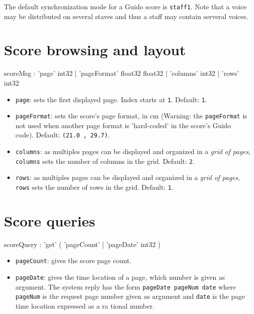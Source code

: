 \documentclass[a4paper,twoside]{report}
\newcommand{\sublevel}[1]	{\section{#1}}
\newcommand{\OSC}[1]		{\texttt{#1}}
\newcommand{\values}[1]	{\texttt{#1}}
\begin{document}
The default synchronization mode for a Guido score is \OSC{staff1}.
Note that a voice may be distributed on several staves and thus a staff may contain serveral voices.


\sublevel{Score browsing and layout}
\label{guidolayout}

\begin{rail}
scoreMsg : 	  'page' int32
				| 'pageFormat' float32 float32
				| 'columns' int32
				| 'rows' int32
\end{rail}

\begin{itemize}
\item \OSC{page}: sets the first displayed page. Index starts at \values{1}. Default: \values{1}.

\item \OSC{pageFormat}: sets the score's page format, in cm (Warning: the \OSC{pageFormat} is not used when another page format is 'hard-coded' in the score's Guido code). Default: \values{(21.0 , 29.7)}.

\item \OSC{columns}: as multiples pages can be displayed and organized in a \emph{grid of pages}, \OSC{columns} sets the number of columns in the grid. Default: \values{2}.

\item \OSC{rows}: as multiples pages can be displayed and organized in a \emph{grid of pages}, \OSC{rows} sets the number of rows in the grid. Default: \values{1}.
\end{itemize}

\sublevel{Score queries}
\label{guidoqueries}

\begin{rail}
scoreQuery : 	'get' (
				'pageCount'
			| 	'pageDate' int32
			)
\end{rail}

\begin{itemize}
\item \OSC{pageCount}: gives the score page count.
\item \OSC{pageDate}: gives the time location of a page, which number is given as argument. The system reply has the form \OSC{pageDate pageNum date} where \OSC{pageNum} is the request page number given as argument and \OSC{date} is the page time location expressed as a ra	tional number.
\end{itemize}
\end{document}
